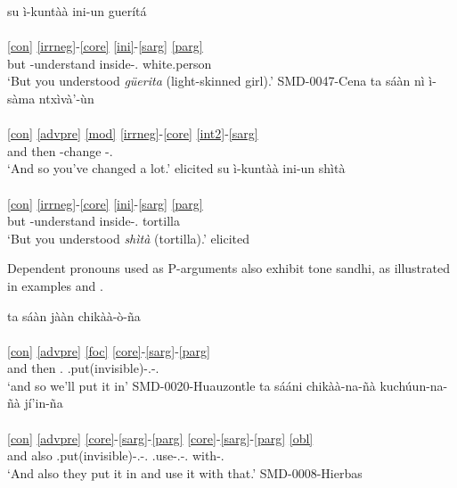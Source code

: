 \documentclass[output=paper]{langscibook}
\begin{document}
\ea
    \ea \label{ex:sandhiother1}
    \gllll  su ì-kuntàà ini-un guerítá \\
        [su³ i¹-ku³ⁿdaː¹¹ i³ni³-ũ³ we³ɾi⁵ta⁵] \\
        \ref{con} \ref{irrneg}-\ref{core} \ref{ini}-\ref{sarg} \ref{parg} \\
        but \Cmpl-understand inside-\Ssg.\Nhon{} white.person \\
    \glt `But you understood \textit{güerita} (light-skinned girl).' \hfill SMD-0047-Cena
    \ex \label{ex:sandhiother2}
    \gllll ta sáàn nì ì-sàma ntxìvà'-ùn \\
        [ta³ sãː⁵¹ ni¹ i¹-sa¹ma³ ⁿʥi¹βa¹ʔ-ũ¹] \\
        \ref{con} \ref{advpre} \ref{mod} \ref{irrneg}-\ref{core} \ref{int2}-\ref{sarg} \\
        and then \Mod{} \Cmpl-change \Intens-\Ssg.\Nhon{} \\
    \glt `And so you've changed a lot.' \hfill elicited
    \ex \label{ex:sandhiother3}
    \gllll  su ì-kuntàà ini-un shìtà \\
            [su³ i¹-ku³ⁿdaː¹¹ i³ni³-ũ³ ʃi¹ta¹] \\
        \ref{con} \ref{irrneg}-\ref{core} \ref{ini}-\ref{sarg} \ref{parg} \\
        but \Cmpl-understand inside-\Ssg.\Nhon{} tortilla \\
    \glt `But you understood \textit{shìtà} (tortilla).' \hfill elicited
    \z
\z

Dependent pronouns used as P-arguments also exhibit tone sandhi, as illustrated in examples  and .

\ea
    \ea \label{ex:sandhiparg1}
    \gllll  ta sáàn jààn chikàà-ò-ña \\
        [ta³ sãː⁵¹ hãː¹¹ tʃi³kaː¹¹-o¹-ɲa³] \\
        \ref{con} \ref{advpre} \ref{foc} \ref{core}-\ref{sarg}-\ref{parg} \\
        and then \Dem.\Dist{} \Pot.put(invisible)-\Fpl.\Incl-\Third.\Thing{}\\
    \glt `and so we'll put it in' \hfill SMD-0020-Huauzontle
    \ex \label{ex:sandhiparg2}
    \gllll ta sááni chikàà-na-ñà kuchúun-na-ñà jí'in-ña \\
            [ta³ sãː⁵⁵ni³ tʃi³kaː¹¹-na³-ɲa¹ ku³tʃũː⁵³-na³-ɲa¹ hi⁵ʔĩ³-ɲa³]\\
        \ref{con} \ref{advpre} \ref{core}-\ref{sarg}-\ref{parg} \ref{core}-\ref{sarg}-\ref{parg} \ref{obl} \\
        and also \Pot.put(invisible)-\Tpl.\Hum-\Third.\Thing{} \Pot.use-\Tpl.\Hum-\Third.\Thing{} with-\Third.\Thing{} \\
    \glt `And also they put it in and use it with that.' \hfill SMD-0008-Hierbas
    \z
\z
\end{document}
